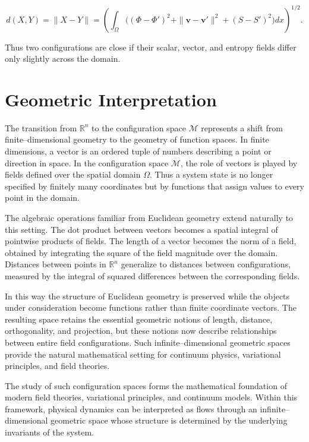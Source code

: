\documentclass[11pt, openany]{book}
\theoremstyle{plain}
\theoremstyle{definition}
\theoremstyle{remark}
\begin{document}
\[
d(X,Y)=\|X-Y\|
=
\left(
\int_{\Omega}
\big(
(\Phi-\Phi')^2
+
\|\mathbf{v}-\mathbf{v}'\|^2
+
(S-S')^2
\big)
dx
\right)^{1/2}.
\]

Thus two configurations are close if their scalar, vector, and entropy
fields differ only slightly across the domain.

\section{Geometric Interpretation}

The transition from $\mathbb{R}^n$ to the configuration space
$\mathcal{M}$ represents a shift from finite–dimensional geometry to the
geometry of function spaces.  In finite dimensions, a vector is an
ordered tuple of numbers describing a point or direction in space.
In the configuration space $\mathcal{M}$, the role of vectors is played
by fields defined over the spatial domain $\Omega$.  Thus a system state
is no longer specified by finitely many coordinates but by functions
that assign values to every point in the domain.

The algebraic operations familiar from Euclidean geometry extend
naturally to this setting.  The dot product between vectors becomes a
spatial integral of pointwise products of fields.  The length of a
vector becomes the norm of a field, obtained by integrating the square
of the field magnitude over the domain.  Distances between points in
$\mathbb{R}^n$ generalize to distances between configurations, measured
by the integral of squared differences between the corresponding
fields.

In this way the structure of Euclidean geometry is preserved while the
objects under consideration become functions rather than finite
coordinate vectors.  The resulting space retains the essential
geometric notions of length, distance, orthogonality, and projection,
but these notions now describe relationships between entire field
configurations.  Such infinite–dimensional geometric spaces provide the
natural mathematical setting for continuum physics, variational
principles, and field theories.

\medskip

The study of such configuration spaces forms the mathematical foundation
of modern field theories, variational principles, and continuum models.
Within this framework, physical dynamics can be interpreted as flows
through an infinite–dimensional geometric space whose structure is
determined by the underlying invariants of the system.
\end{document}

